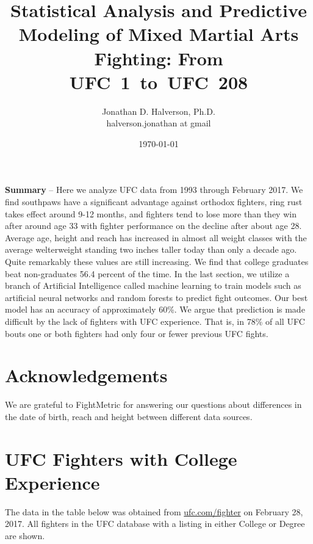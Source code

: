\documentclass[12pt]{article}
\title{\Large\bfseries Statistical Analysis and Predictive Modeling of Mixed Martial Arts Fighting: From UFC~1~to~UFC~208}
\author{\large Jonathan D. Halverson, Ph.D.\\ \tiny halverson.jonathan at gmail}
\date{\large \today}
\begin{document}
\maketitle
\thispagestyle{fancy}
\noindent
\textbf{Summary} -- Here we analyze UFC data from 1993 through February 2017.
We find southpaws have a significant advantage against
orthodox fighters, ring rust takes effect around 9-12 months, and fighters tend to lose
more than they win after around age 33 with fighter performance on the decline after about age 28.
Average age, height and reach has increased in almost all weight classes
with the average welterweight standing two inches taller today than only a decade ago.
Quite remarkably these values are still increasing.
We find that college graduates beat non-graduates
56.4 percent of the time.
In the last section, we utilize
a branch of Artificial Intelligence called machine learning to
train models such as artificial neural networks and random forests to
predict fight outcomes. Our best model has an accuracy of approximately 60\%. We argue that
prediction is made difficult by the lack of fighters with UFC experience. 
That is, in 78\% of all UFC bouts one or both fighters had only four or fewer previous UFC fights.











\section*{Acknowledgements}
We are grateful to FightMetric for answering our questions about differences
in the date of birth, reach and height between different data sources.


\appendix


\section{UFC Fighters with College Experience}
\label{appendix_education}
The data in the table below was obtained from \url{ufc.com/fighter} on February 28, 2017.
All fighters in the UFC database with a listing in either College or Degree are shown.
\begin{center}

\end{center}

%
\end{document}
